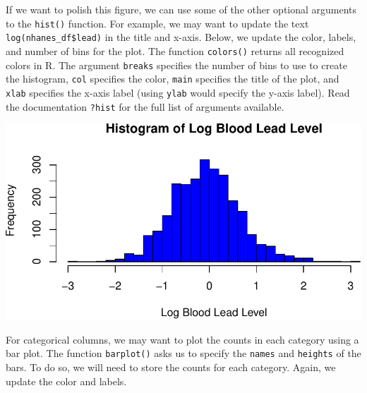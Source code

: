 \documentclass[
  letterpaper,
]{krantz}
\makeatletter
\newenvironment{Shaded}{\begin{snugshade}}{\end{snugshade}}
\newcommand{\AttributeTok}[1]{\textcolor[rgb]{0.40,0.45,0.13}{#1}}
\newcommand{\DecValTok}[1]{\textcolor[rgb]{0.68,0.00,0.00}{#1}}
\newcommand{\FunctionTok}[1]{\textcolor[rgb]{0.28,0.35,0.67}{#1}}
\newcommand{\NormalTok}[1]{\textcolor[rgb]{0.00,0.23,0.31}{#1}}
\newcommand{\SpecialCharTok}[1]{\textcolor[rgb]{0.37,0.37,0.37}{#1}}
\newcommand{\StringTok}[1]{\textcolor[rgb]{0.13,0.47,0.30}{#1}}
\newenvironment{kframe}{%
\medskip{}
\setlength{\fboxsep}{.8em}
 \def\at@end@of@kframe{}%
 \ifinner\ifhmode%
  \def\at@end@of@kframe{\end{minipage}}%
  \begin{minipage}{\columnwidth}%
 \fi\fi%
 \def\FrameCommand##1{\hskip\@totalleftmargin \hskip-\fboxsep
 \colorbox{shadecolor}{##1}\hskip-\fboxsep
     \hskip-\linewidth \hskip-\@totalleftmargin \hskip\columnwidth}%
 \MakeFramed {\advance\hsize-\width
   \@totalleftmargin\z@ \linewidth\hsize
   \@setminipage}}%
 {\par\unskip\endMakeFramed%
 \at@end@of@kframe}
\renewenvironment{Shaded}{\begin{kframe}}{\end{kframe}}
\makeatother
\begin{document}
If we want to polish this figure, we can use some of the other optional
arguments to the \texttt{hist()} function. For example, we may want to
update the text \texttt{log(nhanes\_df\$lead)} in the title and x-axis.
Below, we update the color, labels, and number of bins for the plot. The
function \texttt{colors()} returns all recognized colors in R. The
argument \texttt{breaks} specifies the number of bins to use to create
the histogram, \texttt{col} specifies the color, \texttt{main} specifies
the title of the plot, and \texttt{xlab} specifies the x-axis label
(using \texttt{ylab} would specify the y-axis label). Read the
documentation \texttt{?hist} for the full list of arguments available.

\begin{Shaded}
\end{Shaded}

\begin{center}
\includegraphics[width=1\textwidth,height=\textheight]{book/exploratory_analysis_files/figure-pdf/unnamed-chunk-9-1.pdf}
\end{center}

For categorical columns, we may want to plot the counts in each category
using a bar plot. The function \texttt{barplot()} asks us to specify the
\texttt{names} and \texttt{heights} of the bars. To do so, we will need
to store the counts for each category. Again, we update the color and
labels.
\end{document}
